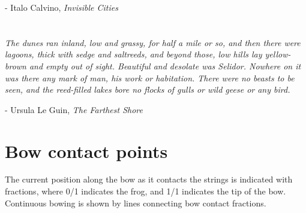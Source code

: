 \documentclass{article}
\begin{document}
\begin{textblock}{11}
- Italo Calvino, \emph{Invisible Cities}

\section{}

\textit{The dunes ran inland, low and grassy, for half a mile or so, and then
there were lagoons, thick with sedge and saltreeds, and beyond those, low hills
lay yellow-brown and empty out of sight. Beautiful and desolate was Selidor.
Nowhere on it was there any mark of man, his work or habitation. There were no
beasts to be seen, and the reed-filled lakes bore no flocks of gulls or wild
geese or any bird. }

- Ursula Le Guin, \emph{The Farthest Shore}

\section{Bow contact points}

The current position along the bow as it contacts the strings is indicated
with fractions, where 0/1 indicates the frog, and 1/1 indicates the tip of
the bow. Continuous bowing is shown by lines connecting bow contact
fractions.

\end{textblock}
\end{document}
